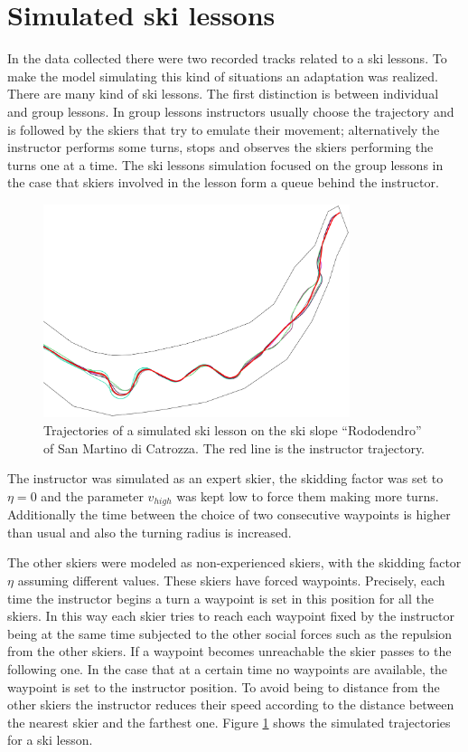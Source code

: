 \documentclass[12pt,a4paper,twoside]{book}
\begin{document}
\section{Simulated ski lessons}\label{ski_lessons}
In the data collected there were two recorded tracks related to a ski lessons. To make the model simulating this kind of situations an adaptation was realized. There are many kind of ski lessons. The first distinction is between individual and group lessons. In group lessons instructors usually choose the trajectory and is followed by the skiers that try to emulate their movement; alternatively the instructor performs some turns, stops and observes the skiers performing the turns one at a time. The ski lessons simulation focused on the group lessons in the case that skiers involved in the lesson form a queue behind the instructor.

\begin{figure}[!b]
  \centering
    \includegraphics[width=0.8\textwidth]{images/lesson.eps}
    \caption{Trajectories of a simulated ski lesson on the ski slope ``Rododendro'' of San Martino di Catrozza. The red line is the instructor trajectory.}\label{lesson}
\end{figure}

The instructor was simulated as an expert skier, the skidding factor was set to $\eta=0$ and the parameter ${v_{high}}$ was kept low to force them making more turns. Additionally the time between the choice of two consecutive waypoints is higher than usual and also the turning radius is increased.

The other skiers were modeled as non-experienced skiers, with the skidding factor $\eta$ assuming different values. These skiers have forced waypoints. Precisely, each time the instructor begins a turn a waypoint is set in this position for all the skiers. In this way each skier tries to reach each waypoint fixed by the instructor being at the same time subjected to the other social forces such as the repulsion from the other skiers. If a waypoint becomes unreachable the skier passes to the following one. In the case that at a certain time no waypoints are available, the waypoint is set to the instructor position. To avoid being to distance from the other skiers the instructor reduces their speed according to the distance between the nearest skier and the farthest one. Figure \ref{lesson} shows the simulated trajectories for a ski lesson.
\end{document}
